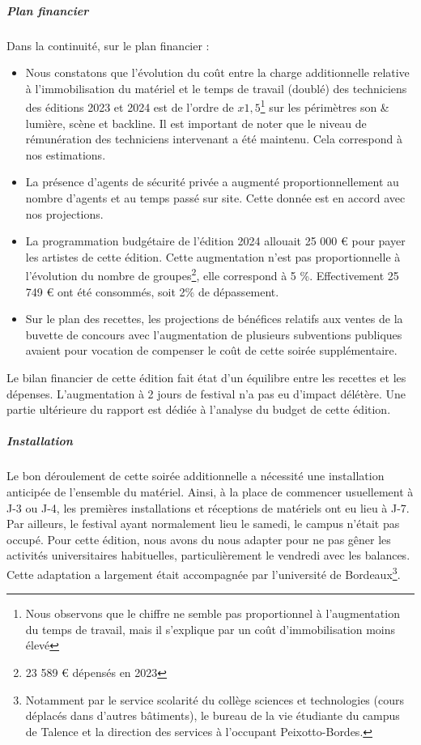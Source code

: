 \documentclass[12pt,a4paper]{report}
\begin{document}
\subparagraph{Plan financier}
Dans la continuité, sur le plan financier :
\begin{itemize}
\item Nous constatons que l'évolution du coût entre la charge additionnelle relative à l'immobilisation du matériel et le temps de travail (doublé) des techniciens des éditions 2023 et 2024 est de l'ordre de $x1,5$\footnote{Nous observons que le chiffre ne semble pas proportionnel à l'augmentation du temps de travail, mais il s'explique par un coût d'immobilisation moins élevé} sur les périmètres son \& lumière, scène et backline. Il est important de noter que le niveau de rémunération des techniciens intervenant a été maintenu. Cela correspond à nos estimations.
\item La présence d'agents de sécurité privée a augmenté proportionnellement au nombre d'agents et au temps passé sur site. Cette donnée est en accord avec nos projections.
\item La programmation budgétaire de l'édition 2024 allouait 25 000 € pour payer les artistes de cette édition. Cette augmentation n'est pas proportionnelle à l'évolution du nombre de groupes\footnote{23 589 € dépensés en 2023}, elle correspond à 5 \%. Effectivement 25 749 € ont été consommés, soit 2\% de dépassement.
\item Sur le plan des recettes, les projections de bénéfices relatifs aux ventes de la buvette de concours avec l'augmentation de plusieurs subventions publiques avaient pour vocation de compenser le coût de cette soirée supplémentaire.\\
\end{itemize}
Le bilan financier de cette édition fait état d'un équilibre entre les recettes et les dépenses. L'augmentation à 2 jours de festival n'a pas eu d'impact délétère. Une partie ultérieure du rapport est dédiée à l'analyse du budget de cette édition.

\subparagraph{Installation}
Le bon déroulement de cette soirée additionnelle a nécessité une installation anticipée de l'ensemble du matériel. Ainsi, à la place de commencer usuellement à J-3 ou J-4, les premières installations et réceptions de matériels ont eu lieu à J-7. Par ailleurs, le festival ayant normalement lieu le samedi, le campus n'était pas occupé. Pour cette édition, nous avons du nous adapter pour ne pas gêner les activités universitaires habituelles, particulièrement le vendredi avec les balances. Cette adaptation a largement était accompagnée par l'université de Bordeaux\footnote{Notamment par le service scolarité du collège sciences et technologies (cours déplacés dans d'autres bâtiments), le bureau de la vie étudiante du campus de Talence et la direction des services à l'occupant Peixotto-Bordes.}.
\end{document}
